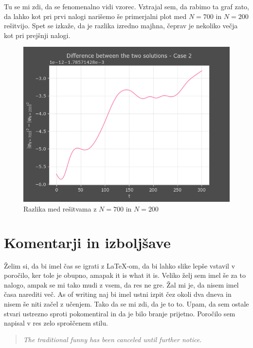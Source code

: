 \documentclass[a4paper]{article}
\begin{document}
Tu se mi zdi, da se fenomenalno vidi vzorec. Vztrajal sem, da rabimo ta graf zato, da lahko kot pri 
prvi nalogi narišemo še primerjalni plot med $N=700$ in $N=200$ rešitvijo. Spet se izkaže, da je razlika
izredno majhna, čeprav je nekoliko večja kot pri prejšnji nalogi.

\begin{figure}[H]
    \centering
    \includegraphics[width=\textwidth]{./images/delta_case2.png}
    \caption{Razlika med rešitvama z $N=700$ in $N=200$}
\end{figure}

\section{Komentarji in izboljšave}
Želim si, da bi imel čas se igrati z LaTeX-om, da bi lahko slike lepše vstavil v poročilo, ker tole 
je obupno, amapak it is what it is. Veliko želj sem imel še za to nalogo, ampak se mi tako mudi z vsem,
da res ne gre. Žal mi je, da nisem imel časa narediti več. As of writing naj bi imel ustni izpit čez okoli
dva dneva in nisem še niti začel z učenjem. Tako da se mi zdi, da je to to. Upam, da sem ostale stvari
ustrezno sproti pokomentiral in da je bilo branje prijetno. Poročilo sem napisal v res zelo sproščenem
stilu.

\begin{quotation}
    \centering
    \textit{The traditional funny has been canceled until further notice.}
\end{quotation}


%
%
\end{document}
